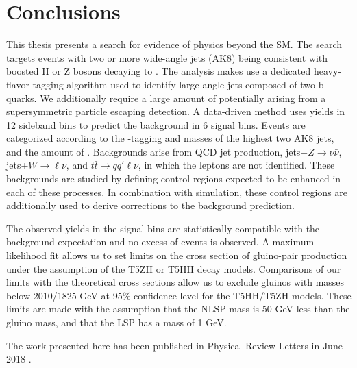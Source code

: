 \chapter{Conclusions}
\label{chap:conclusions}

This thesis presents a search for evidence of physics beyond the SM. The search targets events with two or more wide-angle jets (AK8) being consistent with boosted H or Z bosons decaying to \bbbar. The analysis makes use a dedicated heavy-flavor tagging algorithm used to identify large angle jets composed of two b quarks. We additionally require a large amount of \ptmiss potentially arising from a supersymmetric particle escaping detection. A data-driven method uses yields in 12 sideband bins to predict the background in 6 signal bins. Events are categorized according to the \bbbar-tagging and masses of the highest two \pt AK8 jets, and the amount of \ptmiss. Backgrounds arise from QCD jet production, jets+$Z\rightarrow\nu\bar{\nu}$, jets+$W\rightarrow\ell\nu$, and $t\bar{t}\rightarrow q q' \ell \nu$, in which the leptons are not identified. These backgrounds are studied by defining control regions expected to be enhanced in each of these processes. In combination with simulation, these control regions are additionally used to derive corrections to the background prediction. 

The observed yields in the signal bins are statistically compatible with the background expectation and no excess of events is observed. A maximum-likelihood fit allows us to set limits on the cross section of gluino-pair production under the assumption of the T5ZH or T5HH decay models. Comparisons of our limits with the theoretical cross sections allow us to exclude gluinos with masses below 2010/1825 GeV at 95\% confidence level for the T5HH/T5ZH models. These limits are made with the assumption that the NLSP mass is 50 GeV less than the gluino mass, and that the LSP has a mass of 1 GeV.

The work presented here has been published in Physical Review Letters in June 2018 \cite{CMS-SUS-17-006}.